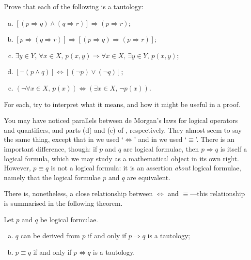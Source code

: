 \begin{exercise}
\label{exTautologies}
Prove that each of the following is a tautology:
\begin{enumerate}[(a)]
\item $[(p \Rightarrow q) \wedge (q \Rightarrow r)] \Rightarrow (p \Rightarrow r)$;
\item $[p \Rightarrow (q \Rightarrow r)] \Rightarrow [(p \Rightarrow q) \Rightarrow (p \Rightarrow r)]$;
\item $\exists y \in Y,\, \forall x \in X,\, p(x,y) \Rightarrow \forall x \in X,\, \exists y \in Y,\, p(x,y)$;
\item $[\neg (p \wedge q)] \Leftrightarrow [(\neg p) \vee (\neg q)]$;
\item $(\neg \forall x \in X,\, p(x)) \Leftrightarrow (\exists x \in X,\, \neg p(x))$.
\end{enumerate}
For each, try to interpret what it means, and how it might be useful in a proof.
\end{exercise}

You may have noticed parallels between de Morgan's laws for logical operators and quantifiers, and parts (d) and (e) of , respectively. They almost seem to say the same thing, except that in  we used `$\Leftrightarrow$' and in  we used `$\equiv$'. There is an important difference, though: if $p$ and $q$ are logical formulae, then $p \Rightarrow q$ is itself a logical formula, which we may study as a mathematical object in its own right. However, $p \equiv q$ is not a logical formula: it is an assertion \textit{about} logical formulae, namely that the logical formulae $p$ and $q$ are equivalent.

There is, nonetheless, a close relationship between $\Leftrightarrow$ and $\equiv$---this relationship is summarised in the following theorem.

\begin{theorem}
\label{thmTautologyAndDerivation}
Let $p$ and $q$ be logical formulae.
\begin{enumerate}[(a)]
\item $q$ can be derived from $p$ if and only if $p \Rightarrow q$ is a tautology;
\item $p \equiv q$ if and only if $p \Leftrightarrow q$ is a tautology.
\end{enumerate}
\end{theorem}

